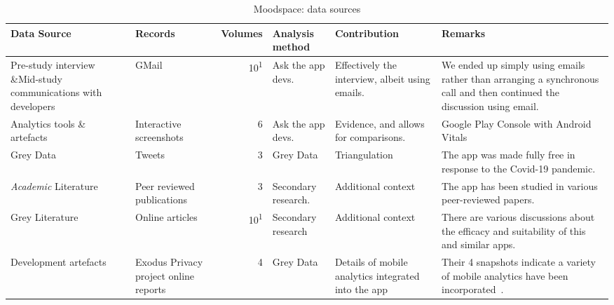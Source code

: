 \begin{table}
    \centering
    \footnotesize
    \tabcolsep=0.12cm
    \begin{tabular}{p{2.3cm}>{\raggedright}p{2.1cm}r>{\raggedright}p{2.4cm}>{\raggedright}p{2.8cm}>{\raggedright\arraybackslash}p{3.2cm}}
        Data Source & Records & Volumes & Analysis method & Contribution & Remarks \\
        \toprule
         Pre-study interview \&Mid-study communications with developers & GMail & 10\textsuperscript{1} & Ask the app devs. & Effectively the interview, albeit using emails.  & We ended up simply using emails rather than arranging a synchronous call and then continued the discussion using email.  \\
         Analytics tools \& artefacts &Interactive screenshots & 6 & Ask the app devs. & Evidence, and allows for comparisons. & Google Play Console with Android Vitals \\
         Grey Data &Tweets & 3 & Grey Data & Triangulation & The app was made fully free in response to the Covid-19 pandemic. \\
         \textit{Academic} Literature  &Peer reviewed publications & 3 & Secondary research. & Additional context & The app has been studied in various peer-reviewed papers.\footnotemark \\
         Grey Literature &Online articles & 10\textsuperscript{1} & Secondary research & Additional context & There are various discussions about the efficacy and suitability of this and similar apps. \\
         Development artefacts\footnotemark & Exodus Privacy project online reports & 4 & Grey Data & Details of mobile analytics integrated into the app & Their 4 snapshots indicate a variety of mobile analytics have been incorporated~\footnotemark. \\
         \bottomrule
    \end{tabular}
    \caption{Moodspace: data sources}
    \label{tab:moodspace-data-sources}
\end{table}



